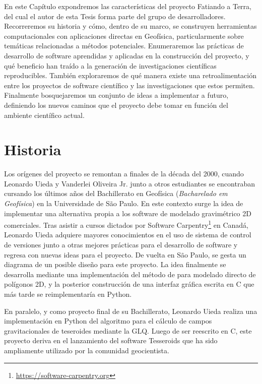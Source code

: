 En este Capítulo expondremos las  características del proyecto
Fatiando a Terra, del cual el autor de esta Tesis forma parte del grupo de
desarrolladores.
Recorreremos su historia y cómo, dentro de su marco, se construyen herramientas
computacionales con aplicaciones directas en Geofísica, particularmente sobre
temáticas relacionadas a métodos potenciales.
Enumeraremos las prácticas de desarrollo de software aprendidas y aplicadas en
la construcción del proyecto, y qué beneficio han traído a la generación de
investigaciones científicas reproducibles.
También exploraremos de qué manera existe una retroalimentación entre los
proyectos de software científico y las investigaciones que estos permiten.
Finalmente bosquejaremos un conjunto de ideas a implementar a futuro,
definiendo los nuevos caminos que el proyecto debe tomar en función del
ambiente científico actual.


\section{Historia}
\label{sec:fatiando-history}

Los orígenes del proyecto se remontan a finales de la década del 2000, cuando
Leonardo Uieda y Vanderlei Oliveira Jr. junto a otros estudiantes se
encontraban cursando los últimos años del Bachillerato en Geofísica
(\emph{Bacharelado em Geofísica}) en la Universidade de São Paulo.
En este contexto surge la idea de implementar una alternativa propia a los
software de modelado gravimétrico 2D comerciales.
Tras asistir a cursos dictados por
Software Carpentry\footnote{%
    \url{https://software-carpentry.org}
}
en Canadá, Leonardo Uieda adquiere mayores conocimientos en el uso de sistema
de control de versiones junto a otras mejores prácticas para el desarrollo de
software y regresa con nuevas ideas para el proyecto.
De vuelta en São Paulo, se gesta un diagrama de un posible diseño para este
proyecto.
La idea finalmente se desarrolla mediante una implementación del método de
\citet{talwani1959} para modelado directo de polígonos 2D, y la posterior
construcción de una interfaz gráfica escrita en C que más tarde se
reimplementaría en Python.

En paralelo, y como proyecto final de su Bachillerato, Leonardo Uieda realiza
una implementación en Python del algoritmo para el cálculo de campos
gravitacionales de teseroides mediante la \ac{GLQ}.
Luego de ser reescrito en C, este proyecto deriva en el lanzamiento del
software Tesseroids \citep{uieda2016} que ha sido ampliamente utilizado por la
comunidad geocientista.

